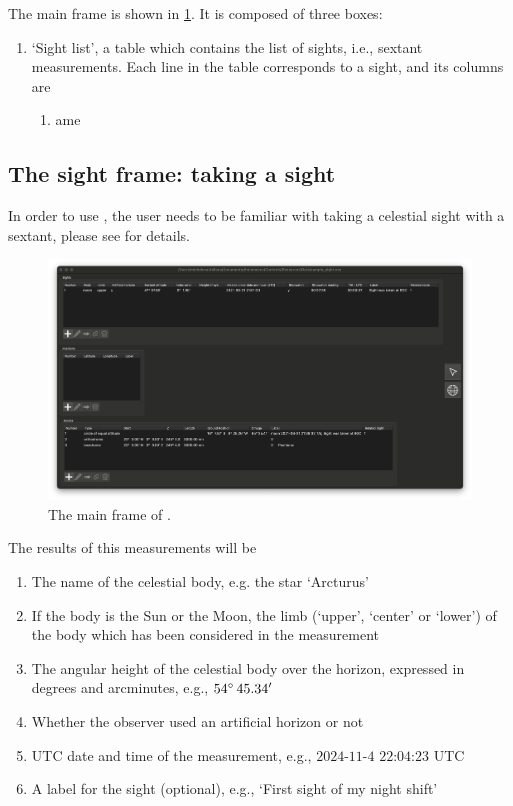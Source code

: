 \documentclass{ol-softwaremanual}
\begin{document}
The main frame is shown in \cref{fig-list-frame}. It is composed of three boxes: 
\begin{enumerate}
  \item `Sight list', a table which contains the list of sights, i.e., sextant measurements. Each line in the table corresponds to a sight, and its columns are  
  \begin{enumerate}
    \item {ame}
  \end{enumerate}
\end{enumerate}

\subsection{The sight frame: taking a sight}

In order to use \thel, the user needs to be familiar with taking a celestial sight with a sextant, please see \cite{bowditch2002the} for details. 

\begin{figure}
  \centering
  \includegraphics[width=1\textwidth]{figures/list-frame.png}
  \caption{
    \label{fig-list-frame}
    The main frame of \thel. 
  }
  \end{figure}

The results of this measurements will be 
\begin{enumerate}
\item \label{item-name} The name of the celestial body, e.g. the star `Arcturus'
\item \label{item-limb}  If the body is the Sun or the Moon, the limb (`upper', `center' or `lower') of the body which has been considered in the measurement
\item \label{item-body-height} The angular height of the celestial body over the horizon, expressed in degrees and arcminutes, e.g., $54 \degree \, 45.34'$
\item \label{item-artificial-horizon} Whether the observer used an artificial horizon or not
\item \label{item-time} \ac{UTC} date and time of the measurement, e.g., $2024$-$11$-$4$ $22$:$04$:$23$ \ac{UTC}
\item \label{item-label} A label for the sight (optional), e.g., `First sight of my night shift'
\end{enumerate}
\end{document}
